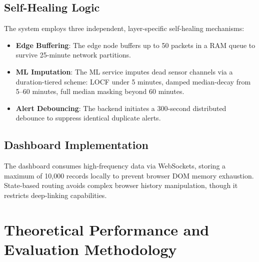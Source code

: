 \documentclass[conference]{IEEEtran}
\begin{document}
\subsection{Self-Healing Logic}
\label{sec:selfheal}
The system employs three independent, layer-specific self-healing mechanisms:
\begin{itemize}
\setlength{\itemsep}{0pt}
\item \textbf{Edge Buffering}: The edge node buffers up to 50 packets in a RAM queue to survive 25-minute network partitions.
\item \textbf{ML Imputation}: The ML service imputes dead sensor channels via a duration-tiered scheme: LOCF under 5 minutes, damped median-decay from 5--60 minutes, full median masking beyond 60 minutes.
\item \textbf{Alert Debouncing}: The backend initiates a 300-second distributed debounce to suppress identical duplicate alerts.
\end{itemize}

\subsection{Dashboard Implementation}
The dashboard consumes high-frequency data via WebSockets, storing a maximum of 10,000 records locally to prevent browser DOM memory exhaustion. State-based routing avoids complex browser history manipulation, though it restricts deep-linking capabilities.

\section{Theoretical Performance and Evaluation Methodology}
\end{document}
